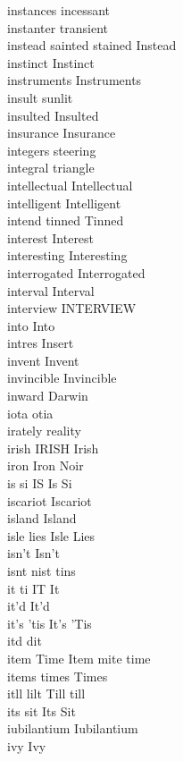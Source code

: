 instances incessant\\
instanter transient\\
instead sainted stained Instead\\
instinct Instinct\\
instruments Instruments\\
insult sunlit\\
insulted Insulted\\
insurance Insurance\\
integers steering\\
integral triangle\\
intellectual Intellectual\\
intelligent Intelligent\\
intend tinned Tinned\\
interest Interest\\
interesting Interesting\\
interrogated Interrogated\\
interval Interval\\
interview INTERVIEW\\
into Into\\
intres Insert\\
invent Invent\\
invincible Invincible\\
inward Darwin\\
iota otia\\
irately reality\\
irish IRISH Irish\\
iron Iron Noir\\
is si IS Is Si\\
iscariot Iscariot\\
island Island\\
isle lies Isle Lies\\
isn't Isn't\\
isnt nist tins\\
it ti IT It\\
it'd It'd\\
it's 'tis It's 'Tis\\
itd dit\\
item Time Item mite time\\
items times Times\\
itll lilt Till till\\
its sit Its Sit\\
iubilantium Iubilantium\\
ivy Ivy\\


